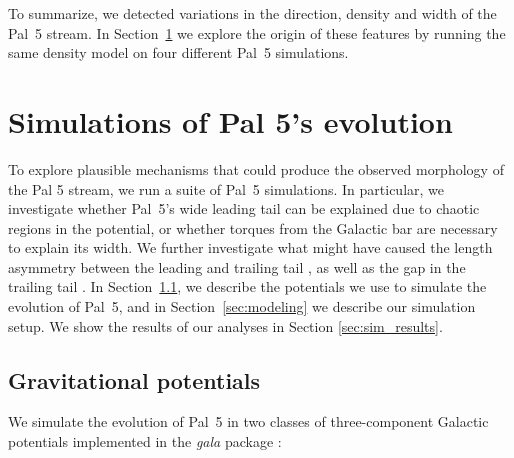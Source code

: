 \documentclass[twocolumn]{aastex62}
\newcommand{\package}[1]{\textsl{#1}}
\newcommand{\sa}[1]{{\color{magenta} SP: #1}}
\begin{document}
To summarize, we detected variations in the direction, density and width of the Pal~5 stream.
In Section~\ref{sec:sim} we explore the origin of these features by running the same density model on four different Pal~5 simulations.


\section{Simulations of Pal 5's evolution}
\label{sec:sim}
To explore plausible mechanisms that could produce the observed morphology of the Pal 5 stream, we run a suite of Pal~5 simulations.
In particular, we investigate whether Pal~5's wide leading tail can be explained due to chaotic regions in the potential, or whether torques from the Galactic bar are necessary to explain its width. We further investigate what might have caused the length asymmetry between the leading and trailing tail , as well as the gap in the trailing tail .
In Section~\ref{sec:potential}, we describe the potentials we use to simulate the evolution of Pal~5, and in Section~\ref{sec:modeling} we describe our simulation setup.
We show the results of our analyses in Section \ref{sec:sim_results}.

\subsection{Gravitational potentials}
\label{sec:potential}
We simulate the evolution of Pal~5 in two classes of three-component Galactic potentials implemented in the  \package{gala} package \citep{gala}:
\end{document}
